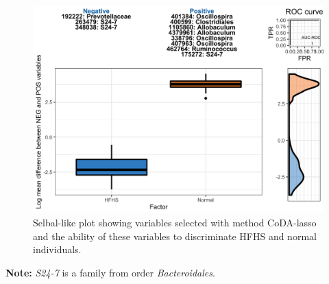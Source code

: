 \documentclass[openany]{book}
\newenvironment{Shaded}{\begin{snugshade}}{\end{snugshade}}
\newcommand{\KeywordTok}[1]{\textcolor[rgb]{0.13,0.29,0.53}{\textbf{#1}}}
\newcommand{\DataTypeTok}[1]{\textcolor[rgb]{0.13,0.29,0.53}{#1}}
\newcommand{\StringTok}[1]{\textcolor[rgb]{0.31,0.60,0.02}{#1}}
\newcommand{\CommentTok}[1]{\textcolor[rgb]{0.56,0.35,0.01}{\textit{#1}}}
\newcommand{\OperatorTok}[1]{\textcolor[rgb]{0.81,0.36,0.00}{\textbf{#1}}}
\newcommand{\NormalTok}[1]{#1}
\begin{document}
\begin{figure}

{\centering \includegraphics[width=1\linewidth]{./Generated_plots/unnamed-chunk-24-1} 

}

\caption{Selbal-like plot showing variables selected with method CoDA-lasso and the ability of these variables to discriminate HFHS and normal individuals.}\label{fig:unnamed-chunk-24}
\end{figure}

\textbf{Note:} \emph{S24-7} is a family from order \emph{Bacteroidales}.

\begin{Shaded}
\end{Shaded}
\end{document}
